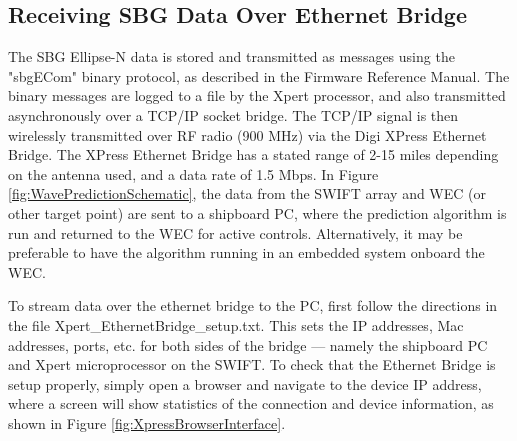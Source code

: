 \documentclass[11pt]{article}
\begin{document}
\subsection{Receiving SBG Data Over Ethernet Bridge}
The SBG Ellipse-N data is stored and transmitted as messages using the "sbgECom" binary protocol, as described in the Firmware Reference Manual.  The binary messages are logged to a file by the Xpert processor, and also transmitted asynchronously over a TCP/IP socket bridge.  The TCP/IP signal is then wirelessly transmitted over RF radio (900 MHz) via the Digi XPress Ethernet Bridge.  The XPress Ethernet Bridge has a stated range of 2-15 miles depending on the antenna used, and a data rate of 1.5 Mbps.  In Figure \ref{fig:WavePredictionSchematic}, the data from the SWIFT array and WEC (or other target point) are sent to a shipboard PC, where the prediction algorithm is run and returned to the WEC for active controls.  Alternatively, it may be preferable to have the algorithm running in an embedded system onboard the WEC.  

To stream data over the ethernet bridge to the PC, first follow the directions in the file Xpert\_EthernetBridge\_setup.txt.  This sets the IP addresses, Mac addresses, ports, etc. for both sides of the bridge --- namely the shipboard PC and Xpert microprocessor on the SWIFT.  To check that the Ethernet Bridge is setup properly, simply open a browser and navigate to the device IP address, where a screen will show statistics of the connection and device information, as shown in Figure \ref{fig:XpressBrowserInterface}.
\end{document}

